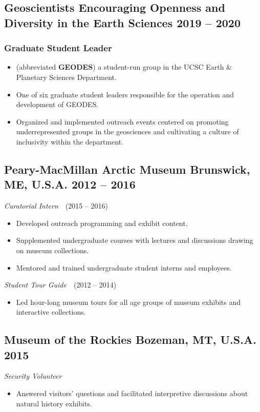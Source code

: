 \documentclass[10pt]{article}
\begin{document}
\subsection*{\textbf{Geoscientists Encouraging Openness and Diversity in the Earth Sciences} \hfill 2019 – 2020}
\subsubsection*{Graduate Student Leader}
\begin{itemize}
	\item (abbreviated \textbf{GEODES}) a student-run group in the UCSC Earth \& Planetary Sciences Department.
	\item One of six graduate student leaders responsible for the operation and development of GEODES.
	\item Organized and implemented outreach events centered on promoting underrepresented groups in the geosciences and cultivating a culture of inclusivity within the department.
\end{itemize}

\subsection*{\textbf{Peary-MacMillan Arctic Museum} \hspace{15pt} Brunswick, ME, U.S.A. \hfill 2012 – 2016}
\textit{Curatorial Intern}~~(2015 – 2016)
\begin{itemize}
	\item Developed outreach programming and exhibit content.
	\item Supplemented undergraduate courses with lectures and discussions drawing on museum collections.
	\item Mentored and trained undergraduate student interns and employees.
\end{itemize}

\textit{Student Tour Guide}~~(2012 – 2014)
\begin{itemize}
	\item Led hour-long museum tours for all age groups of museum exhibits and interactive collections.
\end{itemize}

\subsection*{\textbf{Museum of the Rockies} \hspace{15pt} Bozeman, MT, U.S.A. \hfill 2015}
\textit{Security Volunteer}
\begin{itemize}
	\item Answered visitors' questions and facilitated interpretive discussions about natural history exhibits.
\end{itemize}
\end{document}
